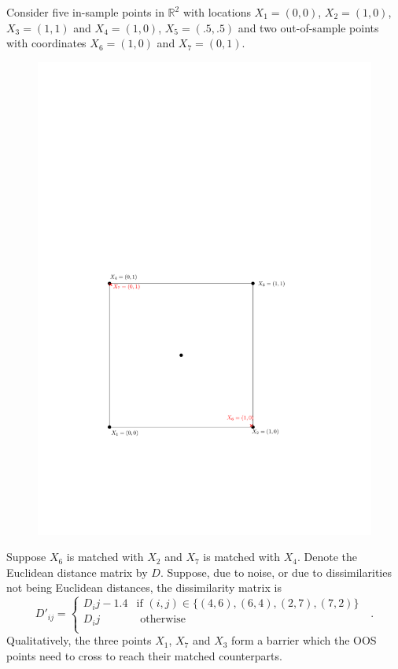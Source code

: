 \documentclass[11pt]{article} %
\begin{document}
Consider five in-sample points in $\mathbb{R}^2$ with locations $X_1=(0,0)$, $X_2=(1,0)$, $X_3=(1,1)$
 and $X_4=(1,0)$, $X_5=(.5,.5)$ and two out-of-sample  points with coordinates $X_6=(1,0)$ and $X_7=(0,1)$.
 \begin{figure}
 \includegraphics{multmin-diag}
 \end{figure} 
  Suppose $X_6$ is matched with $X_2$ and $X_7$ is matched with $X_4$. 
  Denote the Euclidean distance matrix by $D$. 
  Suppose, due to noise, or due to dissimilarities not being Euclidean distances, 
  the dissimilarity matrix is $$D'_{ij}=\begin{cases}
  D_ij-1.4 & \textrm{if  $(i,j) \in \{(4,6),(6,4),(2,7),(7,2)   \}$ }\\
  D_ij  & \textrm{ otherwise}\\
  \end{cases}.$$ 
Qualitatively, the three points $X_1$, $X_7$ and $X_3$ form a barrier which   the OOS points need to cross  to reach their matched counterparts.
   
\end{document}
